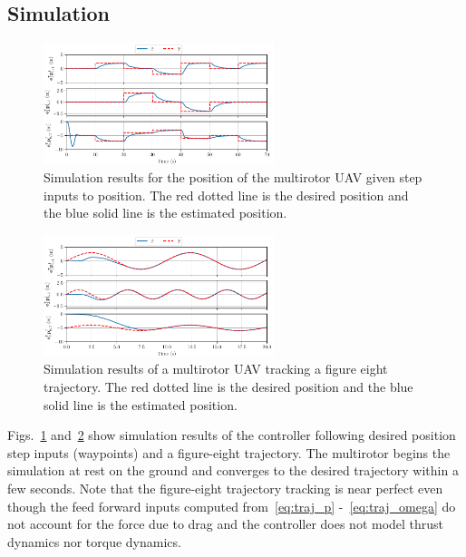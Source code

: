 
\subsection{Simulation}

\begin{figure}
  \centering
  \includegraphics[width=0.6\textwidth]{figures/sim_wps_position}
  \caption[LQR Simulation Results Flying Waypoints]{Simulation results for the position of the multirotor UAV given step
  inputs to position. The red dotted line is the desired position and the blue
solid line is the estimated position.}
  \label{f:sim_wps}
\end{figure}

\begin{figure}
  \centering
  \includegraphics[width=0.6\textwidth]{figures/sim_fig8_position}
  \caption[LQR Simulation Results Flying a Trajectory]{Simulation results of a multirotor UAV tracking a figure eight
  trajectory. The red dotted line is the desired position and the blue solid
line is the estimated position.}
  \label{f:sim_fig8}
\end{figure}

Figs.~\ref{f:sim_wps} and~\ref{f:sim_fig8} show simulation results of the
controller following desired position step inputs (waypoints) and a figure-eight trajectory. The
multirotor begins the simulation at rest on the ground and converges to the
desired trajectory within a few seconds. Note that the figure-eight trajectory
tracking is near perfect even though the feed forward inputs computed
from~\eqref{eq:traj_p} -~\eqref{eq:traj_omega} do not account for the force due to drag and
the controller does not model thrust dynamics nor torque dynamics.
